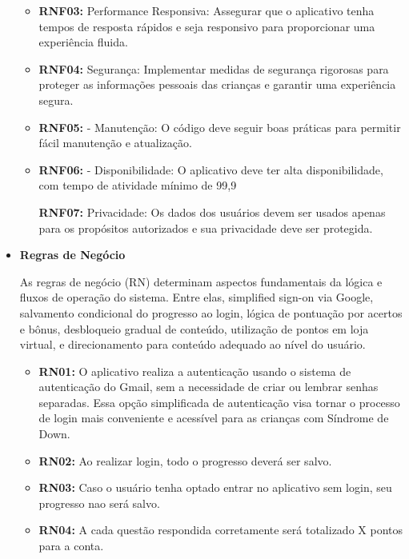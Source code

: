 \begin{itemize}
\begin{itemize}
        \item \textbf{RNF03:} Performance Responsiva: Assegurar que o aplicativo tenha tempos de resposta rápidos e seja responsivo para proporcionar uma experiência fluida.

        \item \textbf{RNF04:} Segurança: Implementar medidas de segurança rigorosas para proteger as informações pessoais das crianças e garantir uma experiência segura.

        \item \textbf{RNF05:} - Manutenção: O código deve seguir boas práticas para permitir fácil manutenção e atualização.

        \item \textbf{RNF06:} - Disponibilidade: O aplicativo deve ter alta disponibilidade, com tempo de atividade mínimo de 99,9%

        \textbf{RNF07:}  Privacidade: Os dados dos usuários devem ser usados apenas para os propósitos autorizados e sua privacidade deve ser protegida.
    \end{itemize}    
    \item \textbf{Regras de Negócio}

    As regras de negócio (RN) determinam aspectos fundamentais da lógica e fluxos de operação do sistema. Entre elas, simplified sign-on via Google, salvamento condicional do progresso ao login, lógica de pontuação por acertos e bônus, desbloqueio gradual de conteúdo, utilização de pontos em loja virtual, e direcionamento para conteúdo adequado ao nível do usuário.
    \begin{itemize}
        
        \item \textbf{RN01:} O aplicativo realiza a autenticação usando o sistema de autenticação do Gmail, sem a necessidade de criar ou lembrar senhas separadas. Essa opção simplificada de autenticação visa tornar o processo de login mais conveniente e acessível para as crianças com Síndrome de Down.

        \item \textbf{RN02:} Ao realizar login, todo o progresso deverá ser salvo.

        \item \textbf{RN03:} Caso o usuário tenha optado entrar no aplicativo sem login, seu progresso nao será salvo.

        \item \textbf{RN04:} A cada questão respondida corretamente será totalizado X pontos para a conta.  


\end{itemize}
\end{itemize}
